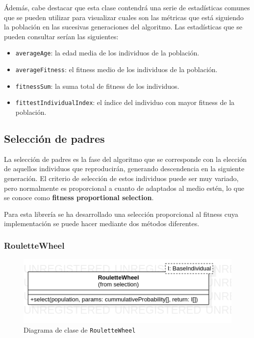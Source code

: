 Ádemás, cabe destacar que esta clase contendrá una serie de estadísticas comunes que se pueden utilizar para visualizar cuales son las métricas que está siguiendo la población en las sucesivas generaciones del algoritmo. Las estadísticas que se pueden consultar serían las siguientes:

\begin{itemize}
    \item \texttt{averageAge}: la edad media de los individuos de la población.
    \item \texttt{averageFitness}: el fitness medio de los individuos de la población.
    \item \texttt{fitnessSum}: la suma total de fitness de los individuos.
    \item \texttt{fittestIndividualIndex}: el índice del individuo con mayor fitness de la población.
\end{itemize}

\subsection{Selección de padres}

La selección de padres es la fase del algoritmo que se corresponde con la elección de aquellos individuos que reproducirán, generando descendencia en la siguiente generación. El criterio de selección de estos individuos puede ser muy variado, pero normalmente es proporcional a cuanto de adaptados al medio estén, lo que se conoce como \textbf{fitness proportional selection}.

Para esta librería se ha desarrollado una selección proporcional al fitness cuya implementación se puede hacer mediante dos métodos diferentes.

\subsubsection{RouletteWheel}

\begin{figure}[ht]
    \centering
    \includegraphics[scale=0.6]{mem/images/cap-4/4.2.5(Selection)/RouletteWheel.png}
    \caption{Diagrama de clase de \texttt{RouletteWheel}}
    \label{fig:generator-uml}
\end{figure}


